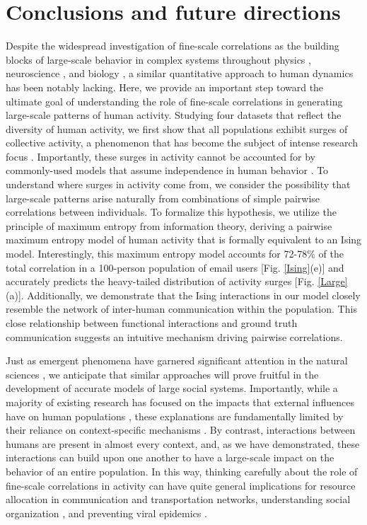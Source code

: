 \documentclass[aps,reprint,superscriptaddress,amsmath,amssymb,longbibliography]{revtex4-1}
\begin{document}
\section{Conclusions and future directions}

Despite the widespread investigation of fine-scale correlations as the building blocks of large-scale behavior in complex systems throughout physics \cite{Jaynes-01,Cover-01}, neuroscience \cite{Schneidman-01, Ganmor-01}, and biology \cite{Bialek-01,Weigt-01,Lezon-01}, a similar quantitative approach to human dynamics has been notably lacking. Here, we provide an important step toward the ultimate goal of understanding the role of fine-scale correlations in generating large-scale patterns of human activity. Studying four datasets that reflect the diversity of human activity, we first show that all populations exhibit surges of collective activity, a phenomenon that has become the subject of intense research focus \cite{Sornette-01,Deschatres-01,Candia-01,Crane-01,Peng-01,Bagrow-01}. Importantly, these surges in activity cannot be accounted for by commonly-used models that assume independence in human behavior \cite{Haight-01,Rasch-01,Karagiannis-01,Gerlough-01}. To understand where surges in activity come from, we consider the possibility that large-scale patterns arise naturally from combinations of simple pairwise correlations between individuals. To formalize this hypothesis, we utilize the principle of maximum entropy from information theory, deriving a pairwise maximum entropy model of human activity that is formally equivalent to an Ising model. Interestingly, this maximum entropy model accounts for 72-78\% of the total correlation in a 100-person population of email users [Fig. \ref{Ising}(e)] and accurately predicts the heavy-tailed distribution of activity surges [Fig. \ref{Large}(a)]. Additionally, we demonstrate that the Ising interactions in our model closely resemble the network of inter-human communication within the population. This close relationship between functional interactions and ground truth communication suggests an intuitive mechanism driving pairwise correlations.

Just as emergent phenomena have garnered significant attention in the natural sciences \cite{Jaynes-01,Cover-01,Schneidman-01,Marre-01,Ganmor-01,Bialek-01,Weigt-01,Lezon-01}, we anticipate that similar approaches will prove fruitful in the development of accurate models of large social systems. Importantly, while a majority of existing research has focused on the impacts that external influences have on human populations \cite{Peng-01,Bagrow-01}, these explanations are fundamentally limited by their reliance on context-specific mechanisms \cite{Crane-01,Candia-01}. By contrast, interactions between humans are present in almost every context, and, as we have demonstrated, these interactions can build upon one another to have a large-scale impact on the behavior of an entire population. In this way, thinking carefully about the role of fine-scale correlations in activity can have quite general implications for resource allocation in communication \cite{Candia-01} and transportation \cite{Peng-01} networks, understanding social organization \cite{Onnela-01}, and preventing viral epidemics \cite{Pastor-01}.
\end{document}
